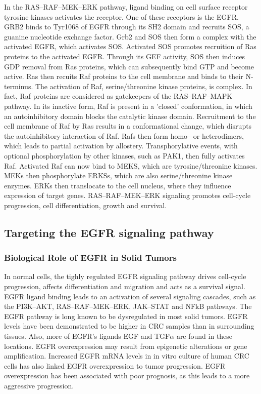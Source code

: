 {{{      In the RAS--RAF--MEK--ERK pathway, ligand binding on cell surface receptor
      tyrosine kinases activates the receptor. One of these receptors is the
      EGFR. GRB2 binds to Tyr1068 of EGFR through its SH2 domain
      and recruits SOS, a guanine nucleotide exchange factor. Grb2 and SOS then
      form a complex with the activated EGFR, which activates SOS. Activated SOS
      promotes recruition of Ras proteins to the activated EGFR. Through its GEF
      activity, SOS then induces GDP removal from Ras proteins, which can
      subsequently bind GTP and become active. Ras then recuits Raf proteins to
      the cell membrane and binds to their N-terminus. The activation of Raf,
      serine/threonine kinase proteins, is complex. In fact, Raf proteins are
      considered as gatekeepers of the RAS--RAF--MAPK pathway. In its inactive
      form, Raf is present in a 'closed' conformation, in which an
      autoinhibitory domain blocks the catalytic kinase domain. Recruitment to
      the cell membrane of Raf by Ras results in a conformational change, which
      disrupts the autoinhibitory interaction of Raf. Rafs then form homo-- or
      heterodimers, which leads to partial activation by allostery.
      Transphorylative events, with optional phosphorylation by other kinases,
      such as PAK1, then fully activates Raf. Activated Raf can now bind to
      MEKS, which are tyrosine/threonine kinases. MEKs then phosphorylate ERKSs,
      which are also serine/threonine kinase enzymes. ERKs then translocate to
      the cell nucleus, where they influence expression of target genes.
      RAS--RAF--MEK--ERK signaling promotes cell-cycle progression, cell
      differentiation, growth and survival.

  \subsection{Targeting the EGFR signaling pathway}

    \subsubsection{Biological Role of EGFR in Solid Tumors}

      In normal cells, the tighly regulated EGFR signaling pathway drives
      cell-cycle progression, affects differentiation and migration and  acts as
      a survival signal. EGFR ligand binding leads to an activation of several
      signaling cascades, such as the PI3K--AKT, RAS--RAF--MEK--ERK, JAK--STAT
      and NFkB pathways. The EGFR pathway is long known to be dysregulated in
      most solid tumors. EGFR levels have been demonstrated to be higher in CRC
      samples than in surrounding tissues. Also, more of EGFR's ligands EGF and
      TGF$\alpha$ are found in these locations. EGFR overexpression may result
      from epigenetic alterations or gene amplification. Increased EGFR mRNA
      levels in in vitro culture of human CRC cells  has also linked EGFR
      overexpression to tumor progression. EGFR overexpression has been
      associated with poor prognosis, as this leads to a more aggressive
      progression.

}}}
